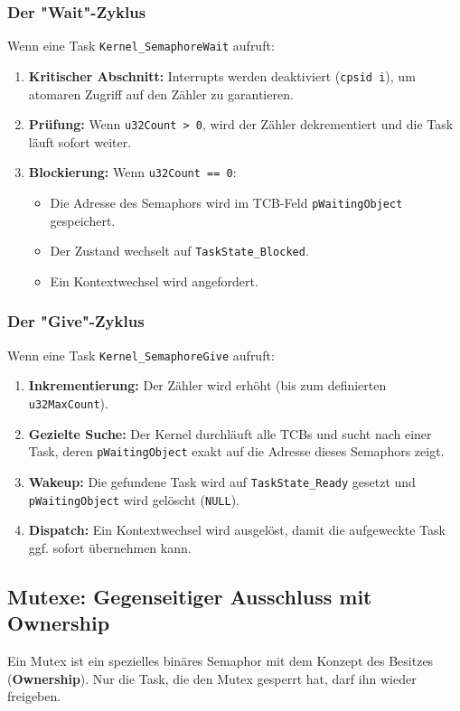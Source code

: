 \documentclass[11pt,a4paper]{article}
\begin{document}
\subsubsection{Der "Wait"-Zyklus}
Wenn eine Task \texttt{Kernel\_SemaphoreWait} aufruft:
\begin{enumerate}
    \item \textbf{Kritischer Abschnitt:} Interrupts werden deaktiviert (\texttt{cpsid i}), um atomaren Zugriff auf den Zähler zu garantieren.
    \item \textbf{Prüfung:} Wenn \texttt{u32Count > 0}, wird der Zähler dekrementiert und die Task läuft sofort weiter.
    \item \textbf{Blockierung:} Wenn \texttt{u32Count == 0}:
    \begin{itemize}
        \item Die Adresse des Semaphors wird im TCB-Feld \texttt{pWaitingObject} gespeichert.
        \item Der Zustand wechselt auf \texttt{TaskState\_Blocked}.
        \item Ein Kontextwechsel wird angefordert.
    \end{itemize}
\end{enumerate}

\subsubsection{Der "Give"-Zyklus}
Wenn eine Task \texttt{Kernel\_SemaphoreGive} aufruft:
\begin{enumerate}
    \item \textbf{Inkrementierung:} Der Zähler wird erhöht (bis zum definierten \texttt{u32MaxCount}).
    \item \textbf{Gezielte Suche:} Der Kernel durchläuft alle TCBs und sucht nach einer Task, deren \texttt{pWaitingObject} exakt auf die Adresse dieses Semaphors zeigt.
    \item \textbf{Wakeup:} Die gefundene Task wird auf \texttt{TaskState\_Ready} gesetzt und \texttt{pWaitingObject} wird gelöscht (\texttt{NULL}).
    \item \textbf{Dispatch:} Ein Kontextwechsel wird ausgelöst, damit die aufgeweckte Task ggf. sofort übernehmen kann.
\end{enumerate}

\subsection{Mutexe: Gegenseitiger Ausschluss mit Ownership}
Ein Mutex ist ein spezielles binäres Semaphor mit dem Konzept des Besitzes (\textbf{Ownership}). Nur die Task, die den Mutex gesperrt hat, darf ihn wieder freigeben.
\end{document}
